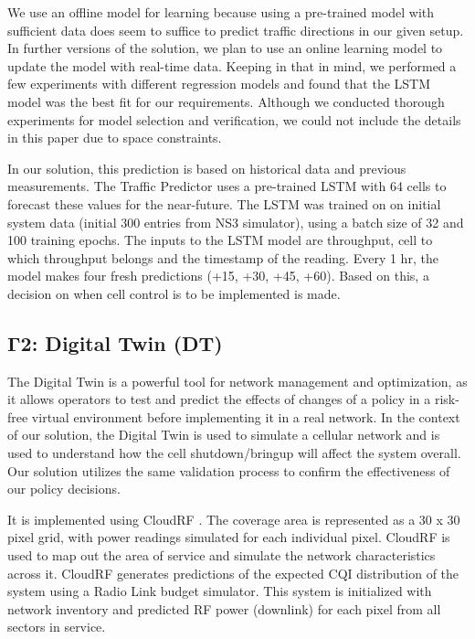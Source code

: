 We use an offline model for learning because using a pre-trained model with sufficient data does seem to suffice to predict traffic directions in our given setup.
In further versions of the solution, we plan to use an online learning model to update the model with real-time data.
Keeping in that in mind, we performed a few experiments with different regression models and found that the LSTM model was the best fit for our requirements.
Although we conducted thorough experiments for model selection and verification, we could not include the details in this paper due to space constraints.

In our solution, this prediction is based on historical data and previous measurements. 
The Traffic Predictor uses a pre-trained LSTM with 64 cells to forecast these values for the near-future. 
The LSTM was trained on on initial system data (initial 300 entries from NS3 simulator), using a batch size of 32 and 100 training epochs. 
The inputs to the LSTM model are throughput, cell to which throughput belongs and the timestamp of the reading.
Every 1 hr, the model makes four fresh predictions (+15, +30, +45, +60).
Based on this, a decision on when cell control is to be implemented is made.

\subsection{$\boldsymbol{\Gamma2}$: Digital Twin (DT)}

The Digital Twin is a powerful tool for network management and optimization, as it allows operators to test and predict the effects of changes of a policy in a risk-free virtual environment before implementing it in a real network.
In the context of our solution, the Digital Twin is used to simulate a cellular network and is used to understand how the cell shutdown/bringup will affect the system overall. 
Our solution utilizes the same validation process to confirm the effectiveness of our policy decisions.

It is implemented using CloudRF \cite{cloudrf}.
The coverage area is represented as a 30 x 30 pixel grid, with power readings simulated for each individual pixel.
CloudRF is used to map out the area of service and simulate the network characteristics across it. 
CloudRF generates predictions of the expected CQI distribution of the system using a Radio Link budget simulator.
This system is initialized with network inventory and predicted RF power (downlink) for each pixel from all sectors in service.

